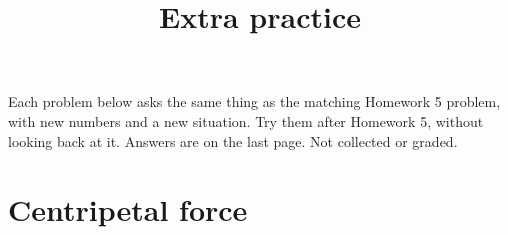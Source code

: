 \documentclass{handout}
\title{Extra practice}
\begin{document}
\maketitle
\noindent{}

\medskip
\noindent Each problem below asks the same thing as the matching Homework 5 problem, with new numbers and a new situation. Try them after Homework 5, without looking back at it. Answers are on the last page. Not collected or graded.

\section{Centripetal force}
\end{document}
